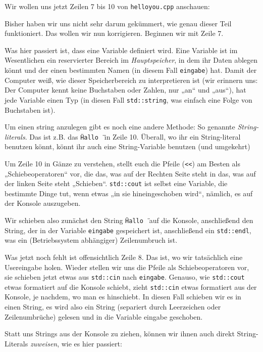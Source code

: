 
Wir wollen uns jetzt Zeilen 7 bis 10 von \texttt{helloyou.cpp} anschauen:

Bisher haben wir uns nicht sehr darum gekümmert, wie genau dieser Teil
funktioniert. Das wollen wir nun korrigieren. Beginnen wir mit Zeile 7.

Was hier passiert ist, dass eine Variable definiert wird. Eine Variable ist im
Wesentlichen ein reservierter Bereich im \emph{Hauptspeicher}, in dem ihr Daten
ablegen könnt und der einen bestimmten Namen (in diesem Fall \texttt{eingabe})
hat. Damit der Computer weiß, wie dieser Speicherbereich zu interpretieren ist
(wir erinnern uns: Der Computer kennt keine Buchstaben oder Zahlen, nur „an“
und „aus“), hat jede Variable einen Typ (in diesen Fall \texttt{std::string},
was einfach eine Folge von Buchstaben ist).

Um einen string anzulegen gibt es noch eine andere Methode: So genannte
\emph{String-literals}. Das ist z.B. das \texttt{\"Hallo \"} in Zeile 10.
Überall, wo ihr ein String-literal benutzen könnt, könnt ihr auch eine
String-Variable benutzen (und umgekehrt)

Um Zeile 10 in Gänze zu verstehen, stellt euch die Pfeile (\verb|<<|) am Besten
als „Schiebeoperatoren“ vor, die das, was auf der Rechten Seite steht in das,
was auf der linken Seite steht „Schieben“. \texttt{std::cout} ist selbst eine
Variable, die bestimmte Dinge tut, wenn etwas „in sie hineingeschoben wird“,
nämlich, es auf der Konsole auszugeben.

Wir schieben also zunächst den String \texttt{\"Hallo \"} auf die Konsole,
anschließend den String, der in der Variable \texttt{eingabe} gespeichert ist,
anschließend ein \texttt{std::endl}, was ein (Betriebssystem abhängiger)
Zeilenumbruch ist.

Was jetzt noch fehlt ist offensichtlich Zeile 8. Das ist, wo wir tatsächlich
eine Usereingabe holen. Wieder stellen wir uns die Pfeile als Schiebeoperatoren
vor, sie schieben jetzt etwas aus \texttt{std::cin} nach \texttt{eingabe}.
Genauso, wie \texttt{std::cout} etwas formatiert auf die Konsole schiebt, zieht
\texttt{std::cin} etwas formatiert aus der Konsole, je nachdem, wo man es
hinschiebt. In diesen Fall schieben wir es in einen String, es wird also ein
String (separiert durch Leerzeichen oder Zeilenumbrüche) gelesen und in die
Variable eingabe geschoben.

Statt uns Strings aus der Konsole zu ziehen, können wir ihnen auch direkt
String-Literals \emph{zuweisen}, wie es hier passiert:

